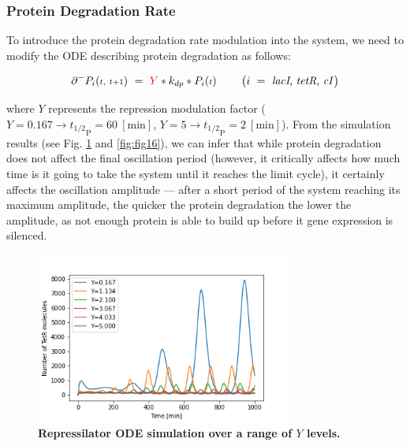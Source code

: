 \documentclass[runningheads,a4paper]{llncs}
\begin{document}
\subsubsection*{Protein Degradation Rate}
To introduce the protein degradation rate modulation into the system, we need to modify the ODE describing protein degradation as follows:

\begin{equation*}
    \partial^{-}P_{i}({\scriptstyle t,\ t+1})\ =\ \textcolor{red}{Y}*k_{dp}*{P_{i}({\scriptstyle t})}
    \hspace{0.8cm}
    \big(i\ =\ \textrm{\textit{lacI}, \textit{tetR}, \textit{cI}}\big)
\end{equation*}

\noindent where $Y$ represents the repression modulation factor ($Y = 0.167 \rightarrow {t_{1/2}}_{\textrm{P}} = 60\ [\textrm{min}]$, $Y = 5 \rightarrow {t_{1/2}}_{\textrm{P}} = 2\ [\textrm{min}]$). From the simulation results (see Fig. \ref{fig:fig15} and \ref{fig:fig16}), we can infer that while protein degradation does not affect the final oscillation period (however, it critically affects how much time is it going to take the system until it reaches the limit cycle), it certainly affects the oscillation amplitude --- after a short period of the system reaching its maximum amplitude, the quicker the protein degradation the lower the amplitude, as not enough protein is able to build up before it gene expression is silenced.

\begin{figure}
    \singlespacing
    \centering
    \includegraphics[width=0.75\textwidth]{suplementary_information_and_code/Task5_figure3.png}
    \caption{\textbf{Repressilator ODE simulation over a range of $Y$ levels.}}
    \label{fig:fig15}
\end{figure}
\end{document}
